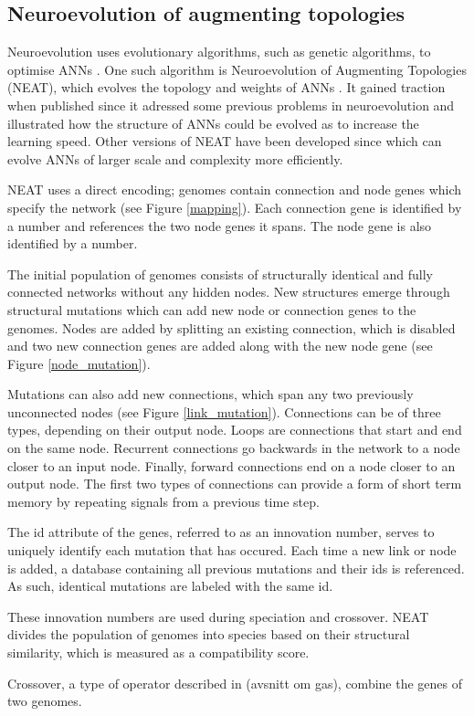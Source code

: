 \newpage

\subsection{Neuroevolution of augmenting topologies}
Neuroevolution uses evolutionary algorithms, such as genetic algorithms, to optimise ANNs \cite{neuroevolution_review}.
One such algorithm is Neuroevolution of Augmenting Topologies (NEAT), which evolves the topology and weights of ANNs \cite{neat_main, neat_short, neat_phd}.
It gained traction when published since it adressed some previous problems in neuroevolution and illustrated how the structure of ANNs could be
evolved as to increase the learning speed. Other versions of NEAT have been developed since which can evolve ANNs of larger scale and complexity more efficiently.

NEAT uses a direct encoding; genomes contain connection and node genes which specify the network (see Figure \ref{mapping}). Each connection gene is identified
by a number and references the two node genes it spans. The node gene is also identified by a number.



The initial population of genomes consists of structurally identical and fully connected networks without any hidden nodes.
New structures emerge through structural mutations which can add new node or connection genes to the genomes. Nodes are added by splitting an existing
connection, which is disabled and two new connection genes are added along with the new node gene (see Figure \ref{node_mutation}).



Mutations can also add new connections, which span any two previously unconnected nodes (see Figure \ref{link_mutation}).
Connections can be of three types, depending on their output node. Loops are connections that start and end on the same node. Recurrent connections go backwards in the network to a node closer to an
input node. Finally, forward connections end on a node closer to an output node. The first two types of connections can provide a form of short term memory by repeating
signals from a previous time step.



The id attribute of the genes, referred to as an innovation number, serves to uniquely identify each mutation that has occured.
Each time a new link or node is added, a database containing all previous mutations and their ids is referenced.
As such, identical mutations are labeled with the same id.

These innovation numbers are used during speciation and crossover. NEAT divides the population of genomes into species based on their structural
similarity, which is measured as a compatibility score.

Crossover, a type of operator described in (avsnitt om gas), combine the genes of two genomes.



